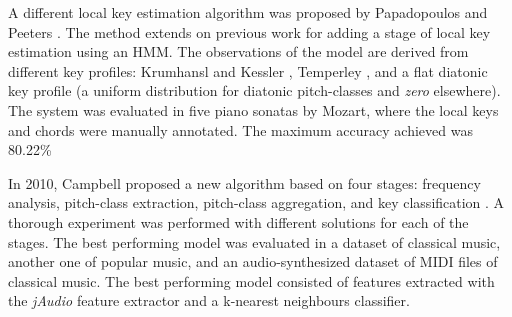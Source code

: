 

A different local key estimation algorithm was proposed by
Papadopoulos and Peeters \parencite{papadopoulos2009local}.
The method extends on previous work
\parencite{papadopoulos2008simultaneous} for adding a stage
of local key estimation using an HMM. The observations of
the model are derived from different key profiles: Krumhansl
and Kessler \parencite{krumhansl1982tracing}, Temperley
\parencite{temperley1999whats}, and a flat diatonic key
profile (a uniform distribution for diatonic pitch-classes
and \emph{zero} elsewhere). The system was evaluated in five
piano sonatas by Mozart, where the local keys and chords
were manually annotated. The maximum accuracy achieved was
80.22\%

In 2010, Campbell proposed a new algorithm based on four
stages: frequency analysis, pitch-class extraction,
pitch-class aggregation, and key classification
\parencite{campbell2010automatic}. A thorough experiment was
performed with different solutions for each of the stages.
The best performing model was evaluated in a dataset of
classical music, another one of popular music, and an
audio-synthesized dataset of MIDI files of classical music.
The best performing model consisted of features extracted
with the \emph{jAudio} feature extractor and a k-nearest
neighbours classifier.

